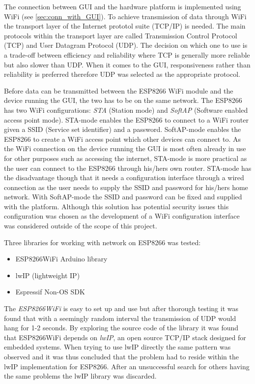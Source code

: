 The connection between GUI and the hardware platform is implemented using WiFi (see \cref{sec:conn_with_GUI}). To achieve transmission of data through WiFi the transport layer of the Internet prototol suite (TCP/IP) is needed. The main protocols within the transport layer are called Transmission Control Protocol (TCP) and User Datagram Protocol (UDP). The decision on which one to use is a trade-off between efficiency and reliability where TCP is generally more reliable but also slower than UDP\cite{website:tcpvsudp}. When it comes to the GUI, responsiveness rather than reliability is preferred therefore UDP was selected as the appropriate protocol.

Before data can be transmitted between the ESP8266 WiFi module and the device running the GUI, the two has to be on the same network. The ESP8266 has two WiFi configurations: \textit{STA} (Station mode) and \textit{SoftAP} (Software enabled access point mode). STA-mode enables the ESP8266 to connect to a WiFi router given a SSID (Service set identifier) and a password. SoftAP-mode enables the ESP8266 to create a WiFi access point which other devices can connect to. As the WiFi connection on the device running the GUI is most often already in use for other purposes such as accessing the internet, STA-mode is more practical as the user can connect to the ESP8266 through his/hers own router. STA-mode has the disadvantage though that it needs a configuration interface through a wired connection as the user needs to supply the SSID and password for his/hers home network. With SoftAP-mode the SSID and password can be fixed and supplied with the platform. Although this solution has potential security issues this configuration was chosen as the development of a WiFi configuration interface was considered outside of the scope of this project.

Three libraries for working with network on ESP8266 was tested:
\begin{itemize}
    \item ESP8266WiFi Arduino library
    \item lwIP (lightweight IP)
    \item Espressif Non-OS SDK
\end{itemize}
The \textit{ESP8266WiFi} is easy to set up and use but after thorough testing it was found that with a seemingly random interval the transmission of UDP would hang for 1-2 seconds. By exploring the source code of the library it was found that 
ESP8266WiFi depends on \textit{lwIP}, an open source TCP/IP stack designed for embedded systems. When trying to use lwIP directly the same pattern was observed and it was thus concluded that the problem had to reside within the lwIP implementation for ESP8266. After an unsuccessful search for others having the same problems the lwIP library was discarded.

